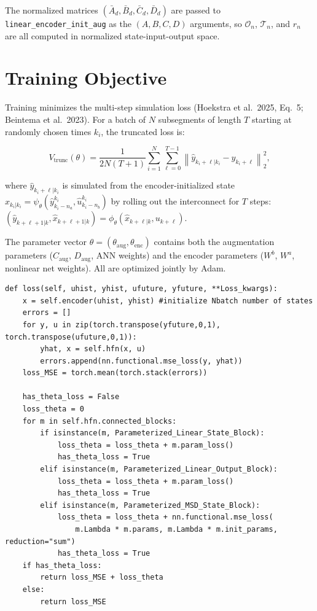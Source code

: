 \documentclass[11pt,a4paper]{article}
\newcommand{\code}[1]{\texttt{#1}}
\newcommand{\codetitle}[2]{\small\texttt{#1}\quad lines #2}
\begin{document}
The normalized matrices $(\bar{A}_d, \bar{B}_d, \bar{C}_d, \bar{D}_d)$
are passed to \code{linear\_encoder\_init\_aug} as the $(A, B, C, D)$
arguments, so $\mathcal{O}_n$, $\mathcal{T}_n$, and $r_n$ are all
computed in normalized state-input-output space.

\section{Training Objective}
\label{sec:loss}

Training minimizes the multi-step simulation loss (Hoekstra et al.\ 2025,
Eq.\ 5; Beintema et al.\ 2023).
For a batch of $N$ subsegments of length $T$ starting at randomly chosen
times $k_i$, the truncated loss is:

\begin{equation}
  V_{\mathrm{trunc}}(\theta) =
  \frac{1}{2N(T+1)} \sum_{i=1}^{N} \sum_{\ell=0}^{T-1}
  \left\| \hat{y}_{k_i+\ell|k_i} - y_{k_i+\ell} \right\|_2^2,
  \label{eq:loss}
\end{equation}

where $\hat{y}_{k_i+\ell|k_i}$ is simulated from the encoder-initialized
state $\hat{x}_{k_i|k_i} = \psi_\theta(\hat{y}_{k_i-n_a}^{k_i}, \hat{u}_{k_i-n_b}^{k_i})$
by rolling out the interconnect for $T$ steps:
$(\hat{y}_{k+\ell+1|k}, \hat{x}_{k+\ell+1|k}) = \phi_\theta(\hat{x}_{k+\ell|k}, u_{k+\ell})$.

The parameter vector $\theta = (\theta_{\mathrm{aug}}, \theta_{\mathrm{enc}})$
contains both the augmentation parameters
($C_{\mathrm{aug}}$, $D_{\mathrm{aug}}$, ANN weights) and the encoder
parameters ($W^b$, $W^a$, nonlinear net weights).
All are optimized jointly by Adam.

\begin{lstlisting}[style=py,
  title={\codetitle{model\_augmentation/fit\_systems/interconnect.py}{432--456} -- \texttt{SSE\_Interconnect.loss()}},
  firstnumber=432]
def loss(self, uhist, yhist, ufuture, yfuture, **Loss_kwargs):
    x = self.encoder(uhist, yhist) #initialize Nbatch number of states
    errors = []
    for y, u in zip(torch.transpose(yfuture,0,1), torch.transpose(ufuture,0,1)):
        yhat, x = self.hfn(x, u)
        errors.append(nn.functional.mse_loss(y, yhat))
    loss_MSE = torch.mean(torch.stack(errors))

    has_theta_loss = False
    loss_theta = 0
    for m in self.hfn.connected_blocks:
        if isinstance(m, Parameterized_Linear_State_Block):
            loss_theta = loss_theta + m.param_loss()
            has_theta_loss = True
        elif isinstance(m, Parameterized_Linear_Output_Block):
            loss_theta = loss_theta + m.param_loss()
            has_theta_loss = True
        elif isinstance(m, Parameterized_MSD_State_Block):
            loss_theta = loss_theta + nn.functional.mse_loss(
                m.Lambda * m.params, m.Lambda * m.init_params, reduction="sum")
            has_theta_loss = True
    if has_theta_loss:
        return loss_MSE + loss_theta
    else:
        return loss_MSE
\end{lstlisting}
\end{document}
